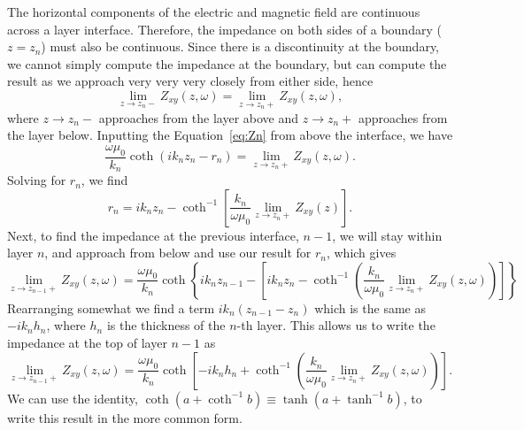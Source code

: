 The horizontal components of the electric and magnetic field are continuous
across a layer interface.  Therefore, the impedance on both sides of a boundary
($z = z_n$) must also be continuous.  Since there is a discontinuity at the
boundary, we cannot simply compute the impedance at the boundary, but can
compute the result as we approach very very very closely from either side, hence
\begin{equation*}
    \lim_{z \to z_n-} Z_{xy}(z,\omega) = \lim_{z \to z_n+} Z_{xy}(z,\omega),
\end{equation*}
where $z \to z_n-$ approaches from the layer above and $z \to z_n+$ approaches
from the layer below.  Inputting the Equation~\ref{eq:Zn} from above the
interface, we have
\begin{equation*}
    \frac{\omega \mu_0}{k_{n}} \coth (i k_n z_n - r_n)
        = \lim_{z \to z_n+} Z_{xy}(z,\omega).
\end{equation*}
Solving for $r_n$, we find
\begin{equation}
    r_n = i k_n z_n - \coth^{-1} 
        \left[ \frac{k_n}{\omega \mu_0} \lim_{z \to z_n+} Z_{xy}(z) \right].
\end{equation}
Next, to find the impedance at the previous interface, $n - 1$, we will stay
within layer $n$, and approach from below and use our result for $r_n$, which
gives
\begin{equation*}
    \lim_{z \to z_{n-1}+} Z_{xy}(z,\omega) = \frac{\omega \mu_0}{k_n} 
    \coth \left\{
        i k_n z_{n-1} - 
        \left[i k_n z_{n} - 
            \coth^{-1} \left(
                \frac{k_{n}}{\omega \mu_0} \lim_{z \to z_{n}+} Z_{xy}(z,\omega)
            \right)
        \right]
    \right\}
\end{equation*}
Rearranging somewhat we find a term $i k_n (z_{n-1} - z_n)$ which is the same as
$-i k_n h_n$, where $h_n$ is the thickness of the $n$-th layer.  This allows us
to write the impedance at the top of layer $n-1$ as
\begin{equation}
    \lim_{z \to z_{n-1}+} Z_{xy}(z,\omega) = 
        \frac{\omega \mu_0}{k_n}
        \coth \left[ -i k_n h_n + \coth^{-1} \left( \frac{k_n}{\omega \mu_0}
        \lim_{z \to z_{n}+} Z_{xy} (z,\omega) \right) \right].
    \label{eq:layersoln}
\end{equation}
We can use the identity, $\coth(a + \coth^{-1} b) \equiv \tanh(a + \tanh^{-1} b)$, to
write this result in the more common form.

